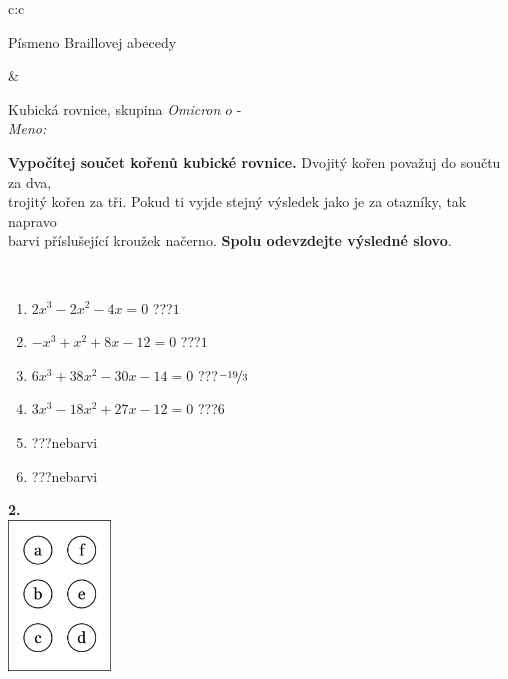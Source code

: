 \documentclass[10pt]{report}
\newcommand\omicron{o}
\begin{document}
\begin{tabular}{c:c}
\begin{minipage}[c][104.5mm][t]{0.5\linewidth}
\begin{center}
\begin{minipage}{0.20\linewidth}
\begin{center}
{\small Písmeno Braillovej abecedy}
\end{center}
\end{minipage}
\end{center}
\end{minipage}
&
\begin{minipage}[c][104.5mm][t]{0.5\linewidth}
\begin{center}
\vspace{7mm}
{\huge Kubická rovnice, skupina \textit{Omicron $\omicron$} -}\\[5mm]
\textit{Meno:}\phantom{xxxxxxxxxxxxxxxxxxxxxxxxxxxxxxxxxxxxxxxxxxxxxxxxxxxxxxxxxxxxxxxxx}\\[5mm]
\begin{minipage}{0.95\linewidth}
\textbf{Vypočítej součet kořenů kubické rovnice.} Dvojitý kořen považuj do součtu za dva,\\trojitý kořen za tři. Pokud ti vyjde stejný výsledek jako je za otazníky, tak napravo\\barvi příslušející kroužek načerno. \textbf{Spolu odevzdejte výsledné slovo}.
\end{minipage}
\\[1mm]
\begin{minipage}{0.79\linewidth}
\begin{center}
\begin{varwidth}{\linewidth}
\begin{enumerate}
\Large
\item $2x^3-2x^2-4x=0$\quad \dotfill\; ???\;\dotfill \quad $1$
\item $-x^3+x^2+8x-12=0$\quad \dotfill\; ???\;\dotfill \quad $1$
\item $6x^3+38x^2-30x-14=0$\quad \dotfill\; ???\;\dotfill \quad $\nicefrac{-19}{3}$
\item $3x^3-18x^2+27x-12=0$\quad \dotfill\; ???\;\dotfill \quad $6$
\item \quad \dotfill\; ???\;\dotfill \quad nebarvi
\item \quad \dotfill\; ???\;\dotfill \quad nebarvi
\end{enumerate}
\end{varwidth}
\end{center}
\end{minipage}
\begin{minipage}{0.20\linewidth}
\begin{center}
{\Huge\bfseries 2.} \\[2mm]
\includegraphics[height=40mm]{../images/braille.png}

\end{center}
\end{minipage}
\end{center}
\end{minipage}
\end{tabular}
\end{document}
